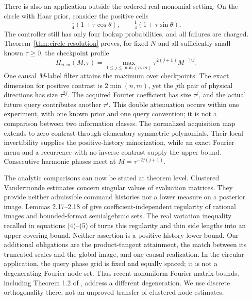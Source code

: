 There is also an application outside the ordered real-monomial setting.
On the circle with Haar prior, consider the positive cells
\[
 \tfrac14(1\pm\tau\cos\theta),\qquad
 \tfrac14(1\pm\tau\sin\theta).
\]
The controller still has only four lookup probabilities, and all failures
are charged. Theorem~\ref{thm:circle-resolution} proves, for fixed $N$
and all sufficiently small known $\tau\ge0$, the checkpoint profile
\[
 H_{n,m}(M,\tau)=
 \max_{1\le j\le\min(n,m)}\tau^{2(j+1)}M^{-1/j}.
\]
One causal $M$-label filter attains the maximum over checkpoints. The
exact dimension for positive contrast is $2\min(n,m)$, yet the $j$th
pair of physical directions has size $\tau^{2j}$. The acquired Fourier
coefficient has size $\tau^j$, and the actual future query contributes
another $\tau^j$. This double attenuation occurs within one experiment,
with one known prior and one query convention; it is not a comparison
between two information classes. The normalized acquisition map extends
to zero contrast through elementary symmetric polynomials. Their local
invertibility supplies the positive-history minorization, while an exact
Fourier menu and a recurrence with no inverse contrast supply the upper
bound. Consecutive harmonic phases meet at
$M=\tau^{-2j(j+1)}$.

The analytic comparisons can now be stated at theorem level.
Clustered Vandermonde estimates \cite{BatenkovEtAl}
concern singular values of evaluation matrices. They provide neither
admissible command histories nor a lower measure on a posterior image.
Lemmas 2.17--2.18 of \cite{ZhangKileel} give coefficient-independent
regularity of rational images and bounded-format semialgebraic sets.
The real variation inequality recalled in equations (4)--(5) of
\cite{ComteHalupczok} turns this regularity and thin side lengths into
an upper covering bound. Neither assertion is a positive-history lower
bound. Our additional obligations are the product-tangent attainment,
the match between its truncated scales and the global image, and one
causal realization. In the circular application, the query phase grid
is fixed and equally spaced; it is not a degenerating Fourier node set.
Thus recent nonuniform Fourier matrix bounds, including Theorem 1.2 of
\cite{ChenLinZhang}, address a different degeneration. We use discrete
orthogonality there, not an unproved transfer of clustered-node estimates.

